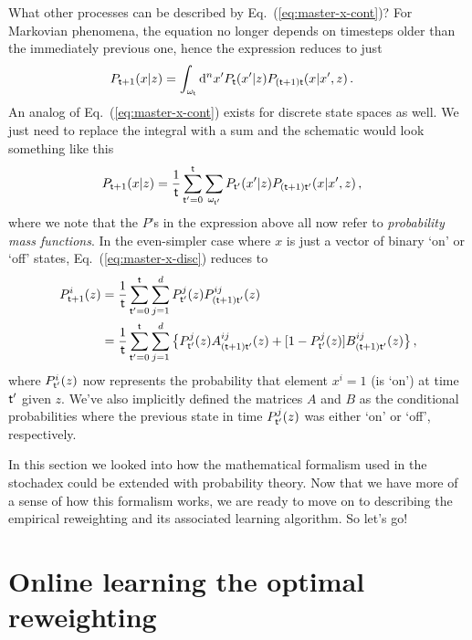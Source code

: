 What other processes can be described by Eq.~(\ref{eq:master-x-cont})? For Markovian phenomena, the equation no longer depends on timesteps older than the immediately previous one, hence the expression reduces to just
\begin{align}
P_{{\sf t}+1}(x\vert z) &= \int_{\omega_{\sf t}}{\rm d}^nx' P_{\sf t}(x'\vert z) P_{({\sf t}+1){\sf t}}(x\vert x',z) \label{eq:master-x-cont-markov} \,.
\end{align}
An analog of Eq.~(\ref{eq:master-x-cont}) exists for discrete state spaces as well. We just need to replace the integral with a sum and the schematic would look something like this
\begin{align}
P_{{\sf t}+1}(x\vert z) &= \frac{1}{{\sf t}}\sum_{{\sf t}'=0}^{\sf t}\sum_{\omega_{{\sf t}'}} P_{{\sf t}'}(x'\vert z) P_{({\sf t}+1){\sf t}'}(x \vert x', z) \label{eq:master-x-disc} \,,
\end{align}
where we note that the $P$'s in the expression above all now refer to \emph{probability mass functions}. In the even-simpler case where $x$ is just a vector of binary `on' or `off' states, Eq.~(\ref{eq:master-x-disc}) reduces to
\begin{align}
P^i_{{\sf t}+1}(z) &= \frac{1}{{\sf t}}\sum_{{\sf t}'=0}^{\sf t} \sum_{j=1}^d P^j_{{\sf t}'}(z) P^{ij}_{({\sf t}+1){\sf t}'}(z) \nonumber \\
&= \frac{1}{{\sf t}}\sum_{{\sf t}'=0}^{\sf t} \sum_{j=1}^d \big\{ P^j_{{\sf t}'}(z) A^{ij}_{({\sf t}+1){\sf t}'}(z) + [1-P^j_{{\sf t}'}(z)] B^{ij}_{({\sf t}+1){\sf t}'}(z) \big\} \label{eq:master-x-disc-binary}\,,
\end{align}
where $P^i_{{\sf t}'}(z)$ now represents the probability that element $x^i=1$ (is `on') at time ${\sf t}'$ given $z$. We've also implicitly defined the matrices $A$ and $B$ as the conditional probabilities where the previous state in time $P^j_{{\sf t}'}(z)$ was either `on' or `off', respectively.

In this section we looked into how the mathematical formalism used in the stochadex could be extended with probability theory. Now that we have more of a sense of how this formalism works, we are ready to move on to describing the empirical reweighting and its associated learning algorithm. So let's go!

\section{\sffamily Online learning the optimal reweighting}

